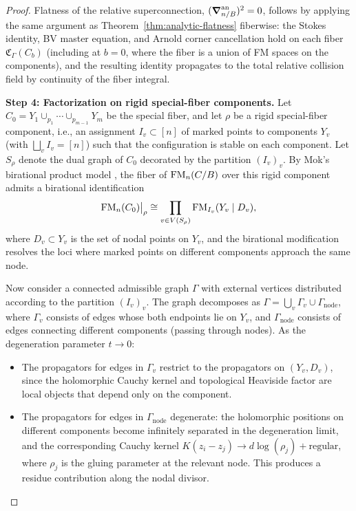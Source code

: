 \begin{proof}
Flatness of the relative superconnection, $(\boldsymbol{\nabla}_{n/B}^{\mathrm{an}})^2 = 0$, follows by applying the same argument as Theorem~\ref{thm:analytic-flatness} fiberwise: the Stokes identity, BV master equation, and Arnold corner cancellation hold on each fiber $\mathfrak C_\Gamma(C_b)$ (including at $b = 0$, where the fiber is a union of FM spaces on the components), and the resulting identity propagates to the total relative collision field by continuity of the fiber integral.

\medskip
\textbf{Step 4: Factorization on rigid special-fiber components.}
Let $C_0 = Y_1 \cup_{p_1} \cdots \cup_{p_{m-1}} Y_m$ be the special fiber, and let $\rho$ be a rigid special-fiber component, i.e., an assignment $I_v \subset [n]$ of marked points to components $Y_v$ (with $\bigsqcup_v I_v = [n]$) such that the configuration is stable on each component. Let $S_\rho$ denote the dual graph of $C_0$ decorated by the partition $(I_v)_v$. By Mok's birational product model \cite{Mok25}, the fiber of $\mathrm{FM}_n(C/B)$ over this rigid component admits a birational identification
\[
 \mathrm{FM}_n(C_0)\big|_\rho
 \cong
 \prod_{v \in V(S_\rho)} \mathrm{FM}_{I_v}(Y_v \mid D_v),
\]
where $D_v \subset Y_v$ is the set of nodal points on $Y_v$, and the birational modification resolves the loci where marked points on different components approach the same node.

Now consider a connected admissible graph $\Gamma$ with external vertices distributed according to the partition $(I_v)_v$. The graph decomposes as $\Gamma = \bigcup_v \Gamma_v \cup \Gamma_{\mathrm{node}}$, where $\Gamma_v$ consists of edges whose both endpoints lie on $Y_v$, and $\Gamma_{\mathrm{node}}$ consists of edges connecting different components (passing through nodes). As the degeneration parameter $t \to 0$:
\begin{itemize}
 \item The propagators for edges in $\Gamma_v$ restrict to the propagators on $(Y_v, D_v)$, since the holomorphic Cauchy kernel and topological Heaviside factor are local objects that depend only on the component.
 \item The propagators for edges in $\Gamma_{\mathrm{node}}$ degenerate: the holomorphic positions on different components become infinitely separated in the degeneration limit, and the corresponding Cauchy kernel $K(z_i - z_j) \to d\log(\rho_j) + \text{regular}$, where $\rho_j$ is the gluing parameter at the relevant node. This produces a residue contribution along the nodal divisor.
\end{itemize}


\end{proof}
